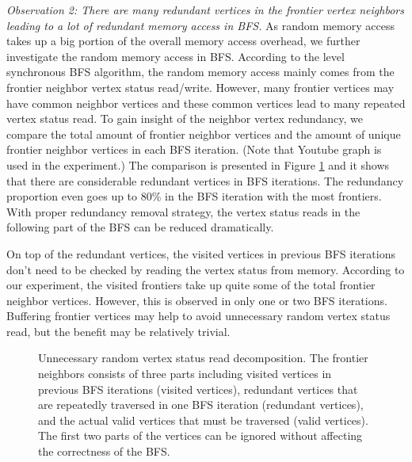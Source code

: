 \textit{Observation 2: There are many redundant vertices in the 
frontier vertex neighbors leading to a lot of redundant memory access in BFS.} 
As random memory access takes up a big portion of the overall memory 
access overhead, we further investigate the random memory access in BFS. 
According to the level synchronous BFS algorithm, the random memory access mainly comes 
from the frontier neighbor vertex status read/write. 
However, many frontier vertices may have common neighbor vertices and these common 
vertices lead to many repeated vertex status read. To gain insight of the neighbor 
vertex redundancy, we compare the total amount of frontier 
neighbor vertices and the amount of unique frontier neighbor vertices in each BFS iteration.
(Note that Youtube graph is used in the experiment.) 
The comparison is presented in Figure \ref{fig:repeat-neighbor} and it shows 
that there are considerable redundant vertices in BFS iterations. 
The redundancy proportion even goes up to 80\% in the BFS iteration with the most frontiers. 
With proper redundancy removal strategy, the vertex status reads in the following 
part of the BFS can be reduced dramatically.

On top of the redundant vertices, the visited vertices in previous 
BFS iterations don't need to be checked by reading the vertex status 
from memory. According to our experiment, the visited frontiers 
take up quite some of the total frontier neighbor vertices. However, this is 
observed in only one or two BFS iterations. Buffering 
frontier vertices may help to avoid unnecessary random vertex status read, 
but the benefit may be relatively trivial.  

\begin{figure}
\caption{Unnecessary random vertex status read decomposition. 
    The frontier neighbors consists of three parts including visited vertices 
    in previous BFS iterations (visited vertices), 
    redundant vertices that are repeatedly traversed in one BFS iteration (redundant vertices), 
    and the actual valid vertices that must be traversed (valid vertices). 
    The first two parts of the vertices can be ignored without 
    affecting the correctness of the BFS.}
\label{fig:repeat-neighbor}
\vspace{-1.2em}
\end{figure}

